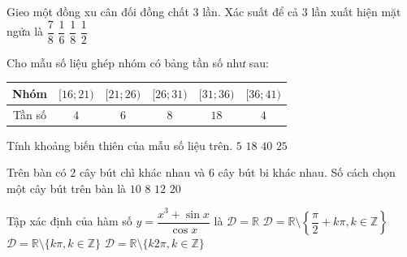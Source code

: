 \begin{ex}%
	Gieo một đồng xu cân đối đồng chất $3$ lần. Xác suất để cả $3$ lần xuất hiện mặt ngửa là
	\choice
	{$\dfrac{7}{8}$}
	{$\dfrac{1}{6}$}
	{\True $\dfrac{1}{8}$}
	{$\dfrac{1}{2}$}
\end{ex}

\begin{ex}%
	Cho mẫu số liệu ghép nhóm có bảng tần số như sau:
	\begin{center}
		\begin{tabular}{|c|c|c|c|c|c|}
			\hline
			Nhóm &$[16;21)$ &$[21;26)$ & $[26;31)$ &$[31;36)$ &$[36;41)$ \\
			\hline
			Tần số & $4$ &$6$ &$8$ &$18$ &$4$ \\
			\hline
		\end{tabular}
	\end{center}
	Tính khoảng biến thiên của mẫu số liệu trên.
	\choice
	{$5$}
	{$18$}
	{$40$}
	{\True $25$}
\end{ex}

\begin{ex}%
	Trên bàn có $2$ cây bút chì khác nhau và $6$ cây bút bi khác nhau. Số cách chọn một cây bút trên bàn là
	\choice
	{$10$}
	{\True $8$}
	{$12$}
	{$20$}
\end{ex}

\begin{ex}%
	Tập xác định của hàm số $y = \dfrac{x^3 + \sin x}{\cos x}$ là
	\choice
	{$\mathscr{D} = \mathbb{R}$}
	{\True $\mathscr{D} = \mathbb{R} \setminus \left\{\dfrac{\pi}{2} + k\pi, k \in \mathbb{Z}\right\}$}
	{$\mathscr{D} = \mathbb{R} \setminus \{k\pi, k \in \mathbb{Z}\}$}
	{$\mathscr{D} = \mathbb{R} \setminus \{k2\pi, k \in \mathbb{Z}\}$}
\end{ex}

